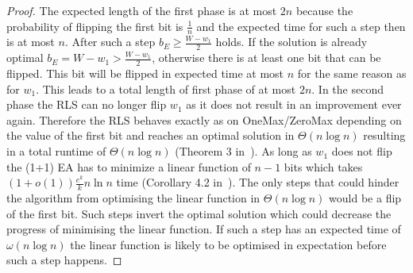 \begin{proof}
    The expected length of the first phase is at most $2n$ because the probability of flipping the first bit is $\frac{1}{n}$ and the expected time for such a step then is at most $n$.
    After such a step $b_E \ge \frac {W-w_1}{2}$ holds.
    If the solution is already optimal $b_E = W-w_1>\frac {W-w_1}{2}$, otherwise there is at least one bit that can be flipped.
    This bit will be flipped in expected time at most $n$ for the same reason as for $w_1$.
    This leads to a total length of first phase of at most $2n$.
    In the second phase the RLS can no longer flip $w_1$ as it does not result in an improvement ever again.
    Therefore the RLS behaves exactly as on OneMax/ZeroMax depending on the value of the first bit and reaches an optimal solution in $\Theta(n\log{}n)$ resulting in a total runtime of $\Theta(n\log{}n)$ (Theorem 3 in~\cite{witt2014fitness}).\newline
    As long as $w_1$ does not flip the (1+1) EA has to minimize a linear function of $n-1$ bits which takes $(1+o(1))\frac{e^k}{k}n\ln n$ time (Corollary 4.2 in~\cite{witt2013tight}).
    The only steps that could hinder the algorithm from optimising the linear function in $\Theta(n\log{}n)$ would be a flip of the first bit.
    Such steps invert the optimal solution which could decrease the progress of minimising the linear function.
    If such a step has an expected time of $\omega(n\log{}n)$ the linear function is likely to be optimised in expectation before such a step happens.

\end{proof}
